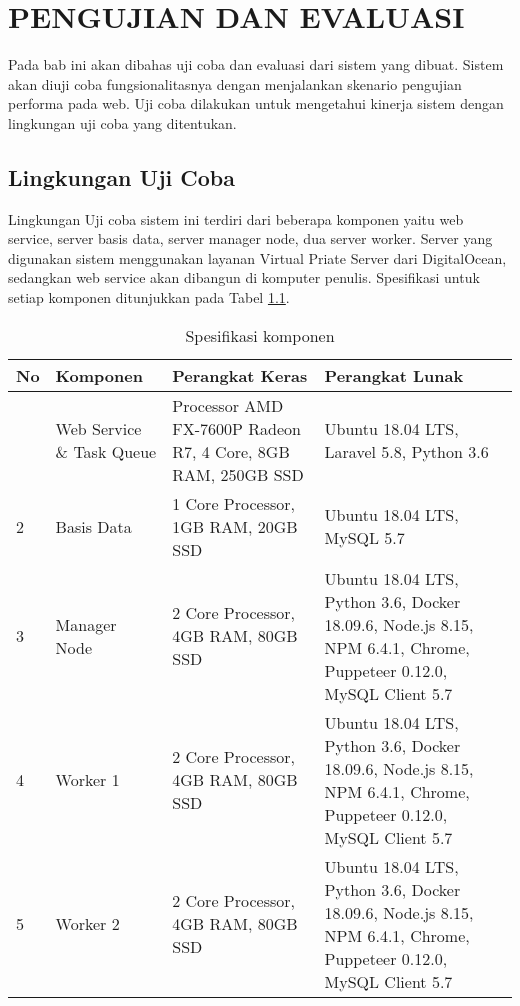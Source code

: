 \chapter{PENGUJIAN DAN EVALUASI}
	Pada bab ini akan dibahas uji coba dan evaluasi dari sistem yang dibuat. Sistem akan diuji coba fungsionalitasnya dengan menjalankan skenario pengujian performa pada web. Uji coba dilakukan untuk mengetahui kinerja sistem dengan lingkungan uji coba yang ditentukan.
	
	\section{Lingkungan Uji Coba}
		Lingkungan Uji coba sistem ini terdiri dari beberapa komponen yaitu web service, server basis data, server manager node, dua server worker. Server yang digunakan sistem menggunakan layanan Virtual Priate Server dari DigitalOcean, sedangkan web service akan dibangun di komputer penulis. Spesifikasi untuk setiap komponen ditunjukkan pada Tabel \ref{tabelspesifikasi}.
		\begin{longtable}{|p{}|p{}|p{}|p{}|}
			\caption{Spesifikasi komponen} \label{tabelspesifikasi} \\
			\hline
			\textbf{No} & \textbf{Komponen} & \textbf{Perangkat Keras} & \textbf{Perangkat Lunak} \\ \hline
			\endhead
			\endfoot
			\endlastfoot
			1 & Web Service \& Task Queue & Processor AMD FX-7600P Radeon R7, 4 Core, 8GB RAM, 250GB SSD & Ubuntu 18.04 LTS, Laravel 5.8, Python 3.6 \\ \hline
			2 & Basis Data & 1 Core Processor, 1GB RAM, 20GB SSD & Ubuntu 18.04 LTS, MySQL 5.7 \\ \hline
			3 & Manager Node & 2 Core Processor, 4GB RAM, 80GB SSD & Ubuntu 18.04 LTS, Python 3.6, Docker 18.09.6, Node.js 8.15, NPM 6.4.1, Chrome, Puppeteer 0.12.0, MySQL Client 5.7 \\ \hline
			4 & Worker 1 & 2 Core Processor, 4GB RAM, 80GB SSD & Ubuntu 18.04 LTS, Python 3.6, Docker 18.09.6, Node.js 8.15, NPM 6.4.1, Chrome, Puppeteer 0.12.0, MySQL Client 5.7 \\ \hline
			5 & Worker 2 & 2 Core Processor, 4GB RAM, 80GB SSD & Ubuntu 18.04 LTS, Python 3.6, Docker 18.09.6, Node.js 8.15, NPM 6.4.1, Chrome, Puppeteer 0.12.0, MySQL Client 5.7 \\ \hline
		\end{longtable}
	
